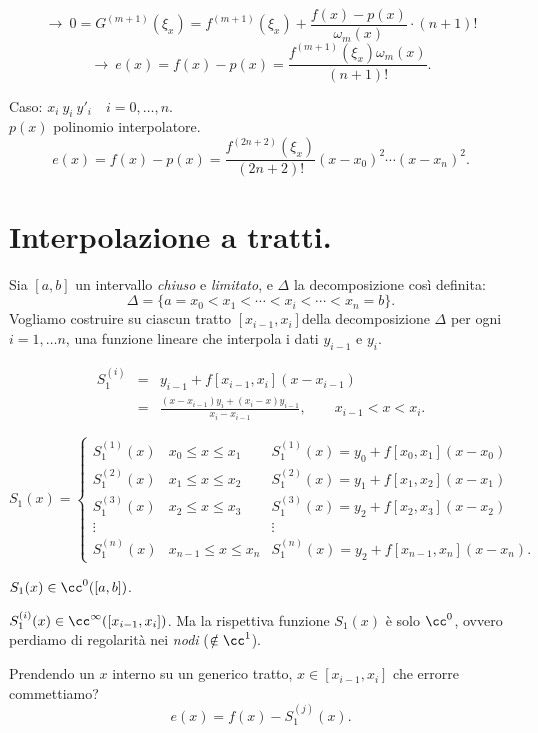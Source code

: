 \begin{dimo}
\[
\longrightarrow \ 0 = G^{(m+1)}(\xi_x) = f^{(m+1)}(\xi_x) + 
\frac{f(x)-p(x)}{\omega_m(x)}\cdot(n+1)!
\]
\[
\longrightarrow \ e(x) = f(x) - p(x) = 
\frac{f^{(m+1)}(\xi_x)\omega_m(x)}{(n+1)!}.
\]

Caso: $x_i\ y_i\ y'_i \quad i = 0,\ldots,n$.\\
$p(x)$ polinomio interpolatore.
\[e(x) = f(x) -p(x) = \frac{f^{(2n +2)}(\xi_x)}{(2n+2)!}(x-x_0)^2\cdots
(x-x_n)^2.\]
\end{dimo}

\section{Interpolazione a tratti.}
Sia $[a,b]$ un intervallo \emph{chiuso} e \emph{limitato}, e $\Delta$
la decomposizione così definita:
\[\Delta = \{a = x_0 < x_1 < \cdots < x_i < \cdots < x_n = b\}.\]
Vogliamo costruire su ciascun tratto $[x_{i-1},x_i]$della decomposizione 
$\Delta$ per ogni $i = 1, \ldots n$, una funzione lineare che interpola i 
dati $y_{i-1}$ e $y_i$.

\[
\begin{array}{lcl}
S^{(i)}_1 & = & y_{i-1} + f[x_{i-1},x_i](x-x_{i-1}) \\
 & = & \frac{(x-x_{i-1})y_i + (x_i-x)y_{i-1}}{x_i-x_{i-1}}, \qquad x_{i-1} < x 
< x_i. 
\end{array}
\]

\[S_1(x) = \left\{\begin{array}{lcl}
S_1^{(1)}(x) & x_0 \leq x \leq x_1 & S_1^{(1)}(x) = y_0 + f[x_0,x_1](x-x_0) \\
S_1^{(2)}(x) & x_1 \leq x \leq x_2 & S_1^{(2)}(x) = y_1 + f[x_1,x_2](x-x_1) \\
S_1^{(3)}(x) & x_2 \leq x \leq x_3 & S_1^{(3)}(x) = y_2 + f[x_2,x_3](x-x_2) \\
\vdots & & \vdots \\
S_1^{(n)}(x) & x_{n-1} \leq x \leq x_n & S_1^{(n)}(x) = y_2 
+ f[x_{n-1},x_n](x-x_n).
\end{array}\right.
\]

$S_1(x) \in \cc^0([a,b])$.

\begin{osse}
$S_1^{(i)}(x) \in \cc^{\infty}([x_{i-1},x_i])$. Ma la rispettiva funzione
$S_1(x)$ è solo $\cc^0$, ovvero perdiamo di regolarità nei \emph{nodi}
($\notin \cc^1$).
\end{osse}

Prendendo un $x$ interno su un generico tratto, $x \in [x_{i-1},x_i]$ che
errorre commettiamo?
\[e(x) = f(x) - S_1^{(j)}(x).\]

